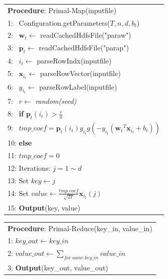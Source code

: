 \documentclass[10pt, conference, compsocconf]{IEEEtran}
\newcommand{\bw}{\mathbf{w}}
\newcommand{\bp}{\mathbf{p}}
\newcommand{\lc}{\left(}
\newcommand{\rc}{\right)}
\newcommand{\tspace}{\hspace*{2em}}
\begin{document}
    \begin{table}[ht]
	\begin{tabular}{l}
	\hline\noalign{\smallskip}
	\textbf{Procedure}: Primal-Map(inputfile) \\
	\noalign{\smallskip}
	\hline
	\noalign{\smallskip}
    1:  ~Configuration.getParameters($T, n, d, b_t$) \\
    2:  ~$\bw_t \leftarrow$ readCachedHdfsFile("paraw") \\
    3:  ~$\bp_t \leftarrow$ readCachedHdfsFile("parap") \\
    4:  ~$i_t \leftarrow$ parseRowIndx(inputfile)\\
    5:  ~$\mathbf{x}_{i_t} \leftarrow$ parseRowVector(inputfile) \\
    6:  ~$y_{i_t} \leftarrow$ parseRowLabel(inputfile) \\
    7:  ~$r \leftarrow$ \textit{random(seed)} \\
    8:  ~\textbf{if} $\bp_t(i_t) > \frac{r}{n}$ \\
    9:  ~\tspace $tmp\_coef=\bp_t(i_t){y}_{{i}_{t}}g\lc-{y}_{{i}_{t}}\lc {{\bw}_{t}}^{T}{\mathbf{x}}_{i_t}+{b}_{t} \rc\rc$ \\
    10: \textbf{else} \\
    11: \tspace $tmp\_coef=0$ \\
    12: Iterations: $j=1 \sim d$ \\
    13: \tspace Set $key \leftarrow j$ \\
    14: \tspace Set $value \leftarrow \frac{tmp\_coef}{\sqrt{2T}}\mathbf{x}_{i_t}(j) $ \\
    15: \tspace \textbf{Output}(key, value) \\
	\hline
	\end{tabular}
	\end{table}
    \begin{table}[ht]
	\begin{tabular}{l}
	\hline\noalign{\smallskip}
	\textbf{Procedure}: Primal-Reduce(key\_in, value\_in) \\
	\noalign{\smallskip}
	\hline
	\noalign{\smallskip}
    1:  $key\_out \leftarrow key\_in$ \\
    2:  $value\_out \leftarrow \sum_{for~same~key\_in}{value\_in} $ \\
    3:  \textbf{Output}(key\_out, value\_out) \\
	\hline
	\end{tabular}
	\end{table}
\end{document}
